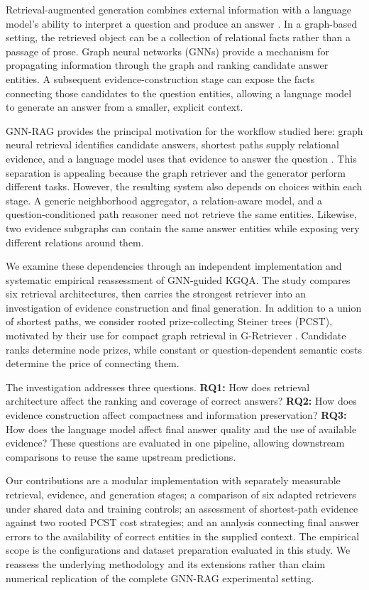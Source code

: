\documentclass[10pt]{article}
\begin{document}
Retrieval-augmented generation combines external information with a language model's ability to interpret a question and produce an answer \citep{lewis2020rag}. In a graph-based setting, the retrieved object can be a collection of relational facts rather than a passage of prose. Graph neural networks (GNNs) provide a mechanism for propagating information through the graph and ranking candidate answer entities. A subsequent evidence-construction stage can expose the facts connecting those candidates to the question entities, allowing a language model to generate an answer from a smaller, explicit context.

GNN-RAG provides the principal motivation for the workflow studied here: graph neural retrieval identifies candidate answers, shortest paths supply relational evidence, and a language model uses that evidence to answer the question \citep{mavromatis2025gnnrag}. This separation is appealing because the graph retriever and the generator perform different tasks. However, the resulting system also depends on choices within each stage. A generic neighborhood aggregator, a relation-aware model, and a question-conditioned path reasoner need not retrieve the same entities. Likewise, two evidence subgraphs can contain the same answer entities while exposing very different relations around them.

We examine these dependencies through an independent implementation and systematic empirical reassessment of GNN-guided KGQA. The study compares six retrieval architectures, then carries the strongest retriever into an investigation of evidence construction and final generation. In addition to a union of shortest paths, we consider rooted prize-collecting Steiner trees (PCST), motivated by their use for compact graph retrieval in G-Retriever \citep{he2024gretriever}. Candidate ranks determine node prizes, while constant or question-dependent semantic costs determine the price of connecting them.

The investigation addresses three questions. \textbf{RQ1:} How does retrieval architecture affect the ranking and coverage of correct answers? \textbf{RQ2:} How does evidence construction affect compactness and information preservation? \textbf{RQ3:} How does the language model affect final answer quality and the use of available evidence? These questions are evaluated in one pipeline, allowing downstream comparisons to reuse the same upstream predictions.

Our contributions are a modular implementation with separately measurable retrieval, evidence, and generation stages; a comparison of six adapted retrievers under shared data and training controls; an assessment of shortest-path evidence against two rooted PCST cost strategies; and an analysis connecting final answer errors to the availability of correct entities in the supplied context. The empirical scope is the configurations and dataset preparation evaluated in this study. We reassess the underlying methodology and its extensions rather than claim numerical replication of the complete GNN-RAG experimental setting.
\end{document}
